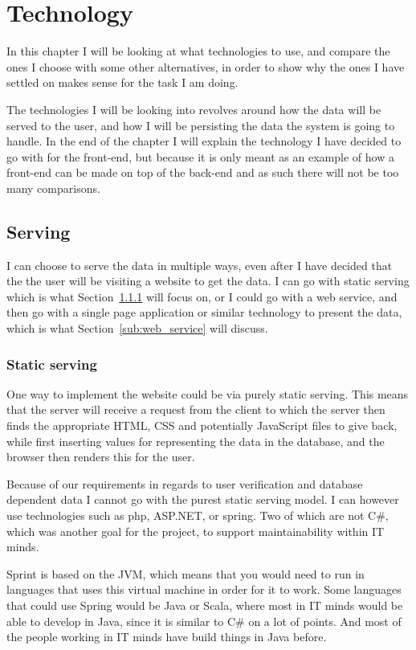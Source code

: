 \chapter{Technology}
\label{chap:Technology}
In this chapter I will be looking at what technologies to use, and compare the
ones I choose with some other alternatives, in order to show why the ones I have
settled on makes sense for the task I am doing. 

The technologies I will be looking into revolves around how the data will be
served to the user, and how I will be persisting the data the system is going to
handle. In the end of the chapter I will explain the technology I have decided
to go with for the front-end, but because it is only meant as an example of how a
front-end can be made on top of the back-end and as such there will not be too
many comparisons.

\section{Serving}
\label{sec:Serving}
I can choose to serve the data in multiple ways, even after I have decided that
the the user will be visiting a website to get the data. I can go with static
serving which is what Section~\ref{sub:Static_serving} will focus on, or I
could go with a web service, and then go with a single page application or
similar technology to present the data, which is what
Section~\ref{sub:web_service} will discuss. 

\subsection{Static serving}
\label{sub:Static_serving}

One way to implement the website could be via purely static serving. This means
that the server will receive a request from the client to which the server then
finds the appropriate HTML, CSS and potentially JavaScript files to give back,
while first inserting values for representing the data in the database, and the
browser then renders this for the user. 

Because of our requirements in regards to user verification and database
dependent data I cannot go with the purest static serving model. I can however
use technologies such as php, ASP.NET, or spring. Two of which are not C\#,
which was another goal for the project, to support maintainability within IT
minds. 

Sprint is based on the JVM\cite{spring-framework}, which means that you would need to run in languages that uses this virtual machine in order for it to work. Some languages that could use Spring would be Java or Scala, where most in IT minds would be able to develop in Java, since it is similar to C\# on a lot of points. And most of the people working in IT minds have build things in Java before.

